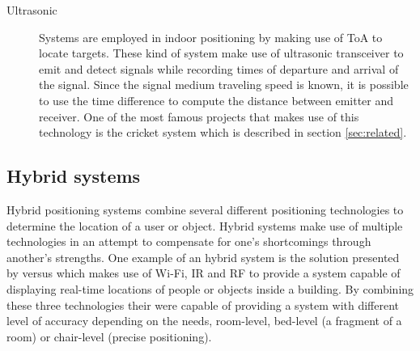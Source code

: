 \begin{description}
  
  
\item [Ultrasonic ]  Systems are employed in indoor positioning by making use of \ac{ToA} to locate targets\cite{survey3}. These kind of system make use of ultrasonic transceiver to emit and detect signals while recording times of departure and arrival of the signal. Since the signal medium traveling speed is known, it is possible to use the time difference to compute the distance between emitter and receiver.  One of the most famous projects that makes use of this technology is the cricket system which is described in section \ref{sec:related}.  
  
  
\end{description}  
  
  
\subsection{Hybrid systems}  
\label{subsec:hybrid}  
   
Hybrid positioning systems combine several different positioning technologies to determine the location of a user or object. Hybrid systems make use of multiple technologies in an attempt to compensate for one's shortcomings through another's strengths. One example of an hybrid system is the solution presented by versus \cite{versus} which makes use of Wi-Fi, IR and RF to provide a system capable of displaying real-time locations of people or objects inside a building. By combining these three technologies their were capable of providing a system with different level of accuracy depending on the needs, room-level, bed-level (a fragment of a room) or chair-level (precise positioning).   
  
  
  
 